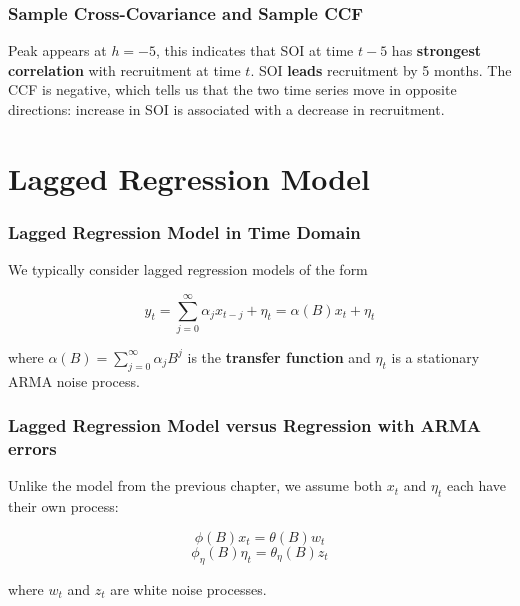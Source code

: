 \documentclass[%
xcolor=pdftex]{beamer}
\begin{document}
\begin{frame}
\frametitle{Sample Cross-Covariance and Sample CCF}

Peak appears at $h=-5$, this indicates that SOI at time $t-5$ has \textbf{strongest correlation} with recruitment at time $t$. SOI \textbf{leads} recruitment by 5 months. The CCF is negative, which tells us that the two time series move in opposite directions: increase in SOI is associated with a decrease in recruitment.

\end{frame}

\section{Lagged Regression Model}
\frame{\tableofcontents[currentsection]}

\begin{frame}
\frametitle{Lagged Regression Model in Time Domain}

We typically consider lagged regression models of the form

\begin{equation} \label{eq:lag1}
y_t = \sum_{j=0}^\infty \alpha_j x_{t-j} + \eta_t = \alpha(B) x_t + \eta_t
\end{equation}

where $\alpha(B) = \sum_{j=0}^\infty \alpha_j B^j$ is the {\bf transfer function} and $\eta_t$ is a stationary ARMA noise process. 



\end{frame}

\begin{frame}
\frametitle{Lagged Regression Model versus Regression with ARMA errors}

Unlike the model from the previous chapter, we assume both $x_t$ and $\eta_t$ each have their own process:

$$
\phi(B) x_t = \theta(B) w_t
$$
$$
\phi_{\eta}(B) \eta_t = \theta_\eta (B) z_t
$$

where $w_t$ and $z_t$ are white noise processes. 


\end{frame}
\end{document}
